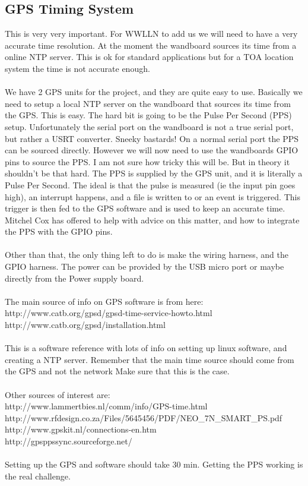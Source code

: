 \documentclass[a4paper,12pt]{article}
\begin{document}
\subsection{GPS Timing System}
This is very very important. For WWLLN to add us we will need to have a very accurate time resolution. At the moment the wandboard sources its time from a online NTP server. This is ok for standard applications but for a TOA location system the time is not accurate enough.\\
\\
We have 2 GPS units for the project, and they are quite easy to use. Basically we need to setup a local NTP server on the wandboard that sources its time from the GPS. This is easy. The hard bit is going to be the Pulse Per Second (PPS) setup. Unfortunately the serial port on the wandboard is not a true serial port, but rather a USRT converter. Sneeky bastards! On a normal serial port the PPS can be sourced directly. However we will now need to use the wandboards GPIO pins to source the PPS. I am not sure how tricky this will be. But in theory it shouldn't be that hard. The PPS is supplied by the GPS unit, and it is literally a Pulse Per Second. The ideal is that the pulse is measured (ie the input pin goes high), an interrupt happens, and a file is written to or an event is triggered. This trigger is then fed to the GPS software and is used to keep an accurate time. Mitchel Cox has offered to help with advice on this matter, and how to integrate the PPS with the GPIO pins. \\
\\
Other than that, the only thing left to do is make the wiring harness, and the GPIO harness. The power can be provided by the USB micro port or maybe directly from the Power supply board.\\
\\
The main source of info on GPS software is from here:\\
http://www.catb.org/gpsd/gpsd-time-service-howto.html\\
http://www.catb.org/gpsd/installation.html\\
\\
This is a software reference with lots of info on setting up linux software, and creating a NTP server. Remember that the main time source should come from the GPS and not the network Make sure that this is the case.\\
\\
Other sources of interest are:\\
http://www.lammertbies.nl/comm/info/GPS-time.html\\
http://www.rfdesign.co.za/Files/5645456/PDF/NEO\_7N\_SMART\_PS.pdf\\
http://www.gpskit.nl/connections-en.htm\\
http://gpsppssync.sourceforge.net/\\
\\
Setting up the GPS and software should take 30 min. Getting the PPS working is the real challenge.
\end{document}
